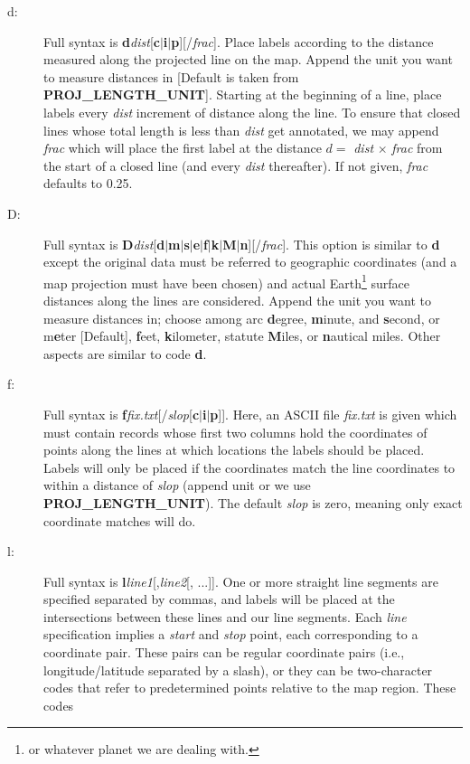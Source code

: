 \begin{description}
\item [d:] Full syntax is \textbf{d}\emph{dist}[\textbf{c$|$i$|$p}][/\emph{frac}].
Place labels according to the distance measured along the projected line on the map.  Append the
unit you want to measure distances in [Default is taken from \textbf{PROJ\_LENGTH\_UNIT}].
Starting at the beginning of a line, place labels every \emph{dist} increment of
distance along the line.  To ensure that closed lines whose total length is less
than \emph{dist} get annotated, we may append \emph{frac} which will place the first
label at the distance $d =$ \emph{dist} $\times$ \emph{frac} from the start of a closed
line (and every \emph{dist} thereafter).  If not given, \emph{frac} defaults to 0.25.
\item [D:] Full syntax is \textbf{D}\emph{dist}[\textbf{d$|$m$|$s$|$e$|$f$|$k$|$M$|$n}][/\emph{frac}].
This option is similar to \textbf{d} except the original data must be referred to geographic
coordinates (and a map projection must have been chosen) and actual Earth\footnote{or whatever
planet we are dealing with.} surface distances along the lines are considered.  Append the
unit you want to measure distances in; choose among arc \textbf{d}egree, \textbf{m}inute, and \textbf{s}econd,
or m\textbf{e}ter [Default], \textbf{f}eet, \textbf{k}ilometer, statute \textbf{M}iles, or \textbf{n}autical miles.  Other aspects are similar to code \textbf{d}.
\item [f:] Full syntax is \textbf{f}\emph{fix.txt}[/\emph{slop}[\textbf{c$|$i$|$p}]].  Here, an ASCII file \emph{fix.txt} is
given which must contain records whose first two columns hold the coordinates of points along
the lines at which locations the labels should be placed.  Labels will only be placed if the coordinates
match the line coordinates to within a distance of \emph{slop} (append unit or we use \textbf{PROJ\_LENGTH\_UNIT}).
The default \emph{slop} is zero, meaning only exact coordinate matches will do.
\item [l:] Full syntax is \textbf{l}\emph{line1}[,\emph{line2}[, ...]].  One or more straight line segments
are specified separated by commas, and labels will be placed at the intersections between these lines and
our line segments.  Each \emph{line} specification implies a \emph{start} and \emph{stop} point, each
corresponding to a coordinate pair.  These pairs can be regular coordinate pairs (i.e., longitude/latitude separated by a slash), or they
can be two-character codes that refer to predetermined points relative to the map region.  These codes

\end{description}
